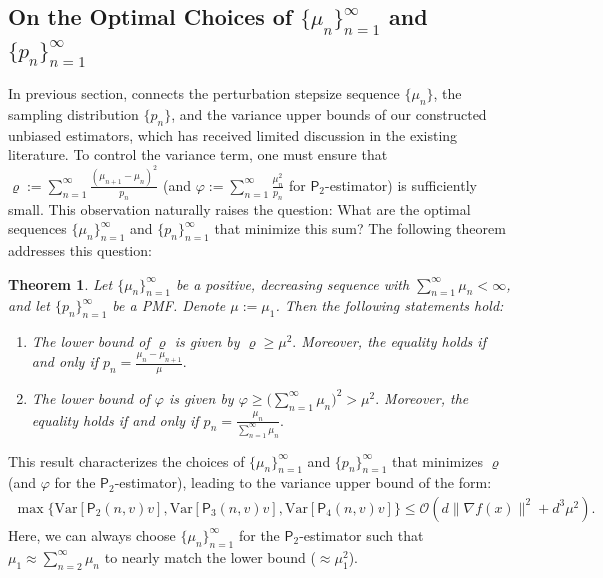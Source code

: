 \documentclass{article}
\newcommand{\Var}{\mathrm{Var}}
\newcommand{\calO}{\mathcal{O}}
\theoremstyle{definition}
\theoremstyle{plain}
\newtheorem{theorem}[definition]{Theorem}
\theoremstyle{remark}
\newcommand{\sfP}{\mathsf{P}}
\begin{document}
\subsection{On the Optimal Choices of $\{ \mu_n\}_{n=1}^\infty$ and $\{ p_n\}_{n=1}^\infty$}
In previous section,  connects  the perturbation stepsize sequence \( \{\mu_n\} \), the sampling distribution \( \{p_n\} \), and the variance upper bounds of our constructed unbiased estimators, which has received limited discussion in the existing literature. To control the variance term, one must ensure that $\varrho:= \sum_{n=1}^\infty\frac{(\mu_{n+1} - \mu_{n})^2}{p_n}$ (and $\varphi:=\sum_{n=1}^\infty\frac{ \mu_{n}^2}{p_n}$ for $\sfP_2$-estimator) is sufficiently small. This observation naturally raises the question: What are the optimal sequences  $\{\mu_n\}_{n=1}^\infty$ and $\{p_n\}_{n=1}^\infty$  that minimize this sum? The following theorem addresses this question:


\begin{theorem}\label{prop:lower_bound_varrho}
Let $\{\mu_n\}_{n=1}^\infty$ be a positive, decreasing sequence with   $\sum_{n=1}^\infty\mu_n<\infty$, and let $\{p_n\}_{n=1}^\infty$ be a PMF.  Denote $\mu:=\mu_1$.  Then the following statements hold:
\begin{enumerate}[label=(\alph*)]
    \item The lower bound of $\varrho$ is given by 
    $\varrho \ge \mu^2.$  
    Moreover, the equality holds if and only if
$p_n = \frac{\mu_n - \mu_{n+1}}{\mu}.$ 
    \item  The lower bound of $\varphi$ is given by 
    $\varphi\geq \Big( \sum_{n=1}^\infty \mu_n \Big)^2> \mu^2.$ 
    Moreover, the equality holds if and only if
$p_n = \frac{\mu_n }{\sum_{n=1}^\infty \mu_n }.$ 
\end{enumerate}
\end{theorem} 

This result characterizes the choices of $\{ \mu_n\}_{n=1}^\infty$ and $\{ p_n\}_{n=1}^\infty$ that minimizes $\varrho$ (and $\varphi$ for the $\sfP_2$-estimator), leading to the variance upper bound of the form:
\begin{align*}
    \max\{\Var[\sfP_2(n,v) v] , \Var[\sfP_3(n,v) v] , \Var[\sfP_4(n,v) v] \}\leq  \calO(d\| \nabla f(x) \|^2+ d^3 \mu^2) .
\end{align*} 
Here, we can always choose $\{ \mu_n\}_{n=1}^\infty$ for the $\sfP_2$-estimator such that $\mu_1 \approx \sum_{n=2}^\infty \mu_{n}$ to nearly match the lower bound ($\approx \mu_1^2$).  
\end{document}

